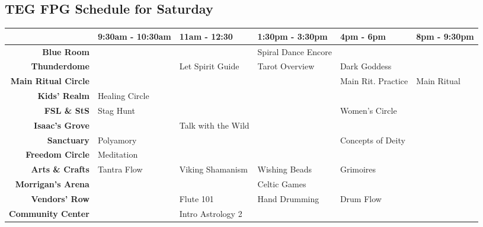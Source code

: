 
 \begin{center}
\section{TEG FPG Schedule for Saturday}

\begin{tabular}{|r|l|l|l|l|l|}
\hline
 & \textbf{9:30am - 10:30am} & \textbf{11am - 12:30} & \textbf{1:30pm - 3:30pm} & \textbf{4pm - 6pm} & \textbf{8pm - 9:30pm} \\
\hline
\textbf{Blue Room} &  &  & Spiral Dance Encore &  &  \\
\hline
\textbf{Thunderdome} &  & Let Spirit Guide & Tarot Overview & Dark Goddess &  \\
\hline
\textbf{Main Ritual Circle} &  &  &  & Main Rit. Practice & Main Ritual \\
\hline
\textbf{Kids' Realm} & Healing Circle &  &  &  &  \\
\hline
\textbf{FSL \& StS} & Stag Hunt &  &  & Women's Circle &  \\
\hline
\textbf{Isaac's Grove} &  & Talk with the Wild &  &  &  \\
\hline
\textbf{Sanctuary} & Polyamory &  &  & Concepts of Deity &  \\
\hline
\textbf{Freedom Circle} & Meditation &  &  &  &  \\
\hline
\textbf{Arts \& Crafts} & Tantra Flow & Viking Shamanism & Wishing Beads & Grimoires &  \\
\hline
\textbf{Morrigan's Arena} &  &  & Celtic Games &  &  \\
\hline
\textbf{Vendors' Row} &  & Flute 101 & Hand Drumming & Drum Flow &  \\
\hline
\textbf{Community Center} &  & Intro Astrology 2 &  &  &  \\
\hline
\end{tabular}
\end{center}